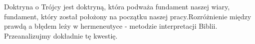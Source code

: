 Doktryna o Trójcy jest doktryną, która podważa fundament naszej wiary, fundament, który został położony na początku naszej pracy.Rozróżnienie między prawdą a błędem leży w hermeneutyce - metodzie interpretacji Biblii. Przeanalizujmy dokładnie tę kwestię.


% 

% 